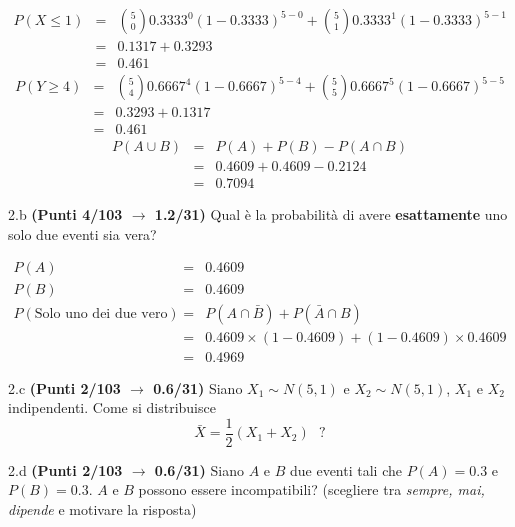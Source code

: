 \documentclass[
  11pt,
]{book}
\theoremstyle{mytheoremstyle}
\theoremstyle{mydefstyle}
\newenvironment{sol}
  {
  \begin{tcolorbox}[enhanced,breakable,arc=0.1mm,boxrule=1pt,colback=white,colframe=iblue,
  title=\bf \fontfamily{lmss}\selectfont \hspace{.5 cm} Soluzione,drop fuzzy shadow]

}{
\end{tcolorbox}
  }
\begin{document}
\begin{sol}
\normalsize 
\begin{eqnarray*}
      P( X \leq 1 ) &=& \binom{ 5 }{ 0 } 0.3333 ^{ 0 }(1- 0.3333 )^{ 5 - 0 }+\binom{ 5 }{ 1 } 0.3333 ^{ 1 }(1- 0.3333 )^{ 5 - 1 } \\                 &=& 0.1317+0.3293 \\                 &=& 0.461 
   \end{eqnarray*}
\normalsize  \normalsize 
\begin{eqnarray*}
      P( Y \geq 4 ) &=& \binom{ 5 }{ 4 } 0.6667 ^{ 4 }(1- 0.6667 )^{ 5 - 4 }+\binom{ 5 }{ 5 } 0.6667 ^{ 5 }(1- 0.6667 )^{ 5 - 5 } \\                 &=& 0.3293+0.1317 \\                 &=& 0.461 
   \end{eqnarray*}
\normalsize 
\begin{eqnarray*}
  P(A\cup B) &=&  P(A)+P(B)-P(A\cap B)\\
  &=& 0.4609+0.4609-0.2124\\
  &=& 0.7094
\end{eqnarray*}

\end{sol}

2.b \textbf{(Punti 4/103 \(\rightarrow\) 1.2/31)} Qual è la probabilità di avere \textbf{esattamente} uno solo due eventi sia vera?

\begin{sol}
\begin{eqnarray*}
  P(A) &=&  0.4609\\
  P(B) &=& 0.4609\\
  P(\text{Solo uno dei due vero}) &=& P(A\cap\bar B)+P(\bar A\cap B)\\
  &=& 0.4609\times (1 - 0.4609)+(1-0.4609)\times  0.4609\\
  &=& 0.4969
\end{eqnarray*}

\end{sol}

2.c \textbf{(Punti 2/103 \(\rightarrow\) 0.6/31)} Siano \(X_1\sim N(5,1)\) e \(X_2\sim N(5,1)\), \(X_1\) e \(X_2\) indipendenti. Come si distribuisce
\[
\bar X = \frac 12 (X_1+X_2) ~~~?
\]

2.d \textbf{(Punti 2/103 \(\rightarrow\) 0.6/31)} Siano \(A\) e \(B\) due eventi tali che \(P(A)=0.3\) e \(P(B)=0.3\). \(A\) e \(B\) possono essere incompatibili? (scegliere tra \emph{sempre, mai, dipende} e motivare la risposta)
\end{document}
